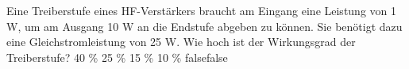     {Eine Treiberstufe eines HF-Verstärkers braucht am Eingang eine Leistung von 1 W, um am Ausgang 10 W an die Endstufe abgeben zu können. Sie benötigt dazu eine Gleichstromleistung von 25 W. Wie hoch ist der Wirkungsgrad der Treiberstufe?}
    {40 \%}
    {25 \%}
    {15 \%}
    {10 \%}
    {false}{false}